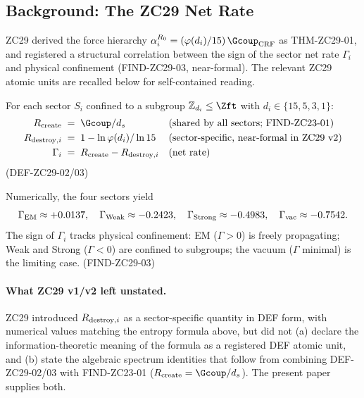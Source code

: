 \documentclass[12pt, a4paper]{article}
\begin{document}
\tableofcontents
\newpage

\subsection{Background: The ZC29 Net Rate}
\label{sec:background}

ZC29 derived the force hierarchy
$\alpha_i^{R_0} = (\varphi(d_i)/15)\,\Gcoup_{\rm CRF}$ as
THM-ZC29-01, and registered a structural correlation between
the sign of the sector net rate $\Gamma_i$ and physical
confinement (FIND-ZC29-03, near-formal). The relevant ZC29
atomic units are recalled below for self-contained reading.

\begin{formalbox}[title={DEF-ZC29-02 / DEF-ZC29-03: Sector net rate
  and destruction rate (recalled from ZC29 v2)}]
For each sector $S_i$ confined to a subgroup $\mathbb{Z}_{d_i}
\leq \Zft$ with $d_i \in \{15, 5, 3, 1\}$:
\begin{align*}
  R_{\rm create}        &\;=\; \Gcoup/d_s
    && \text{(shared by all sectors; FIND-ZC23-01)}\\
  R_{{\rm destroy},i}   &\;=\; 1 - \ln\varphi(d_i)/\ln 15
    && \text{(sector-specific, near-formal in ZC29 v2)}\\
  \Gamma_i              &\;=\; R_{\rm create} - R_{{\rm destroy},i}
    && \text{(net rate)}
\end{align*}
\hfill\textup{(DEF-ZC29-02/03)}
\end{formalbox}

\begin{derivedbox}[title={FIND-ZC29-03 (recalled): Confinement
  asymmetry $\Gamma_i < 0$ for confined sectors}]
Numerically, the four sectors yield
\[
  \Gamma_{\rm EM} \approx +0.0137, \quad
  \Gamma_{\rm Weak} \approx -0.2423, \quad
  \Gamma_{\rm Strong} \approx -0.4983, \quad
  \Gamma_{\rm vac}  \approx -0.7542.
\]
The sign of $\Gamma_i$ tracks physical confinement: EM
($\Gamma > 0$) is freely propagating; Weak and Strong
($\Gamma < 0$) are confined to subgroups; the vacuum
($\Gamma$ minimal) is the limiting case.
\hfill\textup{(FIND-ZC29-03)}
\end{derivedbox}

\paragraph{What ZC29 v1/v2 left unstated.}
ZC29 introduced $R_{{\rm destroy},i}$ as a sector-specific
quantity in DEF form, with numerical values matching the
entropy formula above, but did not (a) declare the
information-theoretic meaning of the formula as a registered
DEF atomic unit, and (b) state the algebraic spectrum
identities that follow from combining DEF-ZC29-02/03 with
FIND-ZC23-01 ($R_{\rm create} = \Gcoup/d_s$). The present
paper supplies both.
\end{document}
